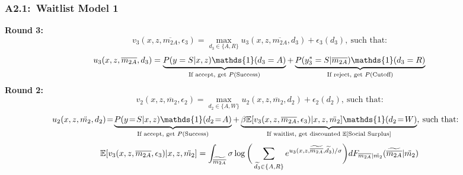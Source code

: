 \documentclass[12pt, aspectratio=169]{beamer}
\begin{document}
\begin{frame}[label=wm1]
\frametitle{A2.1:\ Waitlist Model 1}
\textbf{Round 3:}
\vspace{-5pt}
\begin{equation*}
v_3(x,z,\overline{m_{2A}},\epsilon_3) = \max_{d_3\in\{A,R\}}u_3(x,z,\overline{m_{2A}},d_3)+\epsilon_3(d_3), \: \text{such that:}
\end{equation*}
\begin{equation*}
u_3(x,z,\overline{m_{2A}},d_3) = \underbrace{P(y=S|x,z)\mathds{1}(d_3=A)}_{\text{If accept, get $P(\text{Success})$}}+\underbrace{P(y_3^*=S|\overline{m_{2A}})\mathds{1}(d_3=R)}_{\text{If reject, get $P(\text{Cutoff})$}}
\vspace{5pt}
\end{equation*}
\textbf{Round 2:}
\vspace{-5pt}
\begin{equation*}
v_2(x,z,\ddot{m_2},\epsilon_2) = \max_{d_2\in\{A,W\}}u_2(x,z,\ddot{m_2},d_2)+\epsilon_2(d_2), \: \text{such that:}
\end{equation*}
\begin{equation*}
\!\!\!\!\!\!u_2(x,z,\ddot{m_2},d_2)\!=\!\underbrace{P(y\!=\!S|x,z)\mathds{1}(d_2\!=\!A)}_{\text{If accept, get $P(\text{Success})$}}+\underbrace{\beta\mathbb{E}[v_3(x,z,\overline{m_{2A}},\epsilon_3)|x,z,\ddot{m_2}]\mathds{1}(d_2\!=\!W)}_{\text{If waitlist, get discounted $\mathbb E[\text{Social Surplus}]$}}, \: \text{such that:}
\vspace{2.5pt}
\end{equation*}
\begin{equation*}
\mathbb{E}[v_3(x,z,\overline{m_{2A}},\epsilon_3)|x,z,\ddot{m_2}] = \int_{\widetilde{\overline{m_{2A}}}}\sigma\log\bigg(\sum_{\widetilde{d_3}\in\{A,R\}}e^{u_3(x,z,\widetilde{\overline{m_{2A}}},\widetilde{d_3})/\sigma}\bigg)dF_{\overline{m_{2A}}|\ddot{m_2}}(\widetilde{\overline{m_{2A}}}|\ddot{m_2})
\vspace{-2.5pt}
\end{equation*}
\hyperlink{wmo}{}
\end{frame}
\end{document}
